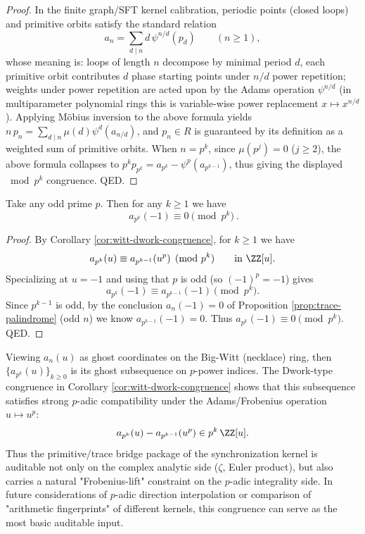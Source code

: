 \begin{proof}
In the finite graph/SFT kernel calibration, periodic points (closed loops) and primitive orbits satisfy the standard relation
\[
a_n=\sum_{d\mid n} d\,\psi^{n/d}(p_d)\qquad(n\ge 1),
\]
whose meaning is: loops of length \(n\) decompose by minimal period \(d\), each primitive orbit contributes \(d\) phase starting points under \(n/d\) power repetition; weights under power repetition are acted upon by the Adams operation \(\psi^{n/d}\) (in multiparameter polynomial rings this is variable-wise power replacement \(x\mapsto x^{n/d}\)).
Applying Möbius inversion to the above formula yields
\(
n\,p_n=\sum_{d\mid n}\mu(d)\psi^d(a_{n/d})
\),
and \(p_n\in R\) is guaranteed by its definition as a weighted sum of primitive orbits.
When \(n=p^k\), since \(\mu(p^j)=0\) (\(j\ge 2\)), the above formula collapses to
\(
p^k p_{p^k}=a_{p^k}-\psi^{p}(a_{p^{k-1}})
\),
thus giving the displayed \(\bmod p^k\) congruence. QED.
\end{proof}

\begin{corollary}\label{cor:witt-dwork-supercongruence-minus1}
Take any odd prime \(p\). Then for any \(k\ge 1\) we have
\[
\boxed{\ a_{p^k}(-1)\equiv 0\pmod{p^k}\ }.
\]
\end{corollary}
\begin{proof}
By Corollary \ref{cor:witt-dwork-congruence}, for \(k\ge 1\) we have
\[
a_{p^k}(u)\equiv a_{p^{k-1}}(u^p)\pmod{p^k}\qquad\text{in}\ \ZZ[u].
\]
Specializing at \(u=-1\) and using that \(p\) is odd (so \((-1)^p=-1\)) gives
\[
a_{p^k}(-1)\equiv a_{p^{k-1}}(-1)\pmod{p^k}.
\]
Since \(p^{k-1}\) is odd, by the conclusion \(a_n(-1)=0\) of Proposition \ref{prop:trace-palindrome} (odd \(n\)) we know \(a_{p^{k-1}}(-1)=0\).
Thus \(a_{p^k}(-1)\equiv 0\pmod{p^k}\). QED.
\end{proof}

\begin{remark}\label{rem:witt-ptypical-ghost}
Viewing \(a_n(u)\) as ghost coordinates on the Big-Witt (necklace) ring, then \(\{a_{p^k}(u)\}_{k\ge 0}\) is its ghost subsequence on \(p\)-power indices.
The Dwork-type congruence in Corollary \ref{cor:witt-dwork-congruence} shows that this subsequence satisfies strong \(p\)-adic compatibility under the Adams/Frobenius operation \(u\mapsto u^p\):
\[
a_{p^k}(u)-a_{p^{k-1}}(u^p)\in p^k\,\ZZ[u].
\]
Thus the primitive/trace bridge package of the synchronization kernel is auditable not only on the complex analytic side (\(\zeta\), Euler product), but also carries a natural "Frobenius-lift" constraint on the \(p\)-adic integrality side.
In future considerations of \(p\)-adic direction interpolation or comparison of "arithmetic fingerprints" of different kernels, this congruence can serve as the most basic auditable input.
\end{remark}

